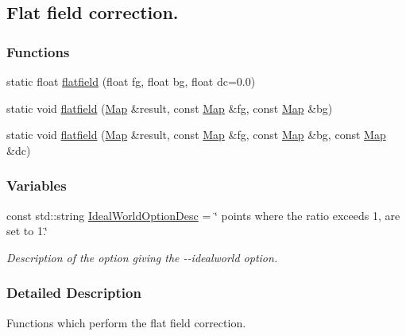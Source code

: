 \hypertarget{group__ff}{
\subsection{Flat field correction.}
\label{group__ff}
}
\subsubsection*{Functions}
\begin{DoxyCompactItemize}
\item 
static float \hyperlink{group__ff_ga27e9065a4a811a23bacb7e7d9dde8833}{flatfield} (float fg, float bg, float dc=0.0)
\item 
static void \hyperlink{group__ff_ga59a639014f022e0ec1f975a574c3a109}{flatfield} (\hyperlink{group__Types_ga8747378c016fc11d9ecbb98787248c25}{Map} \&result, const \hyperlink{group__Types_ga8747378c016fc11d9ecbb98787248c25}{Map} \&fg, const \hyperlink{group__Types_ga8747378c016fc11d9ecbb98787248c25}{Map} \&bg)
\item 
static void \hyperlink{group__ff_ga361ea4cde4043cfc1646e3eefc57b726}{flatfield} (\hyperlink{group__Types_ga8747378c016fc11d9ecbb98787248c25}{Map} \&result, const \hyperlink{group__Types_ga8747378c016fc11d9ecbb98787248c25}{Map} \&fg, const \hyperlink{group__Types_ga8747378c016fc11d9ecbb98787248c25}{Map} \&bg, const \hyperlink{group__Types_ga8747378c016fc11d9ecbb98787248c25}{Map} \&dc)
\end{DoxyCompactItemize}
\subsubsection*{Variables}
\begin{DoxyCompactItemize}
\item 
const std::string \hyperlink{group__ff_ga0d67745bbe69566dd469dfbd1966a87b}{IdealWorldOptionDesc} = \char`\"{} points where the ratio exceeds 1, are set to 1.\char`\"{}
\begin{DoxyCompactList}\small\item\em Description of the option giving the -\/-\/idealworld option. \item\end{DoxyCompactList}\end{DoxyCompactItemize}


\subsubsection{Detailed Description}
Functions which perform the flat field correction. 

